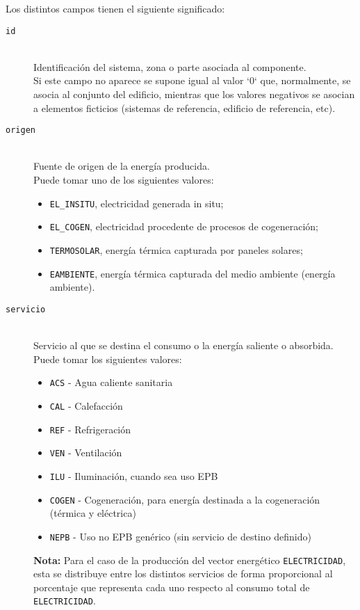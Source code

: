 \documentclass[10pt,notitlepage,oneside,a4paper]{article}
\begin{document}
Los distintos campos tienen el siguiente significado:

\begin{description}
    \item [\texttt{id}] \hfill \\
          Identificación del sistema, zona o parte asociada al componente.\\
          Si este campo no aparece se supone igual al valor `0` que, normalmente, se asocia al conjunto del edificio, mientras que los valores negativos se asocian a elementos ficticios (sistemas de referencia, edificio de referencia, etc).

    \item [\texttt{origen}] \hfill \\
          Fuente de origen de la energía producida.\\
          Puede tomar uno de los siguientes valores:
          \begin{itemize}
              \item \texttt{EL\_INSITU}, electricidad generada in situ;
              \item \texttt{EL\_COGEN}, electricidad procedente de procesos de cogeneración;
              \item \texttt{TERMOSOLAR}, energía térmica capturada por paneles solares;
              \item \texttt{EAMBIENTE}, energía térmica capturada del medio ambiente (energía ambiente).
          \end{itemize}

    \item [\texttt{servicio}] \hfill \\
          Servicio al que se destina el consumo o la energía saliente o absorbida.\\
          Puede tomar los siguientes valores:
          \begin{itemize}
              \item \texttt{ACS} - Agua caliente sanitaria
              \item \texttt{CAL} - Calefacción
              \item \texttt{REF} - Refrigeración
              \item \texttt{VEN} - Ventilación
              \item \texttt{ILU} - Iluminación, cuando sea uso EPB
              \item \texttt{COGEN} - Cogeneración, para energía destinada a la cogeneración (térmica y eléctrica)
              \item \texttt{NEPB} - Uso no EPB genérico (sin servicio de destino definido)
          \end{itemize}
          \begin{myquote}\small
              \textbf{Nota:} Para el caso de la producción del vector energético \texttt{ELECTRICIDAD}, esta se distribuye entre los distintos servicios de forma proporcional al porcentaje que representa cada uno respecto al consumo total de \texttt{ELECTRICIDAD}.
              

\end{myquote}
\end{description}
\end{document}
